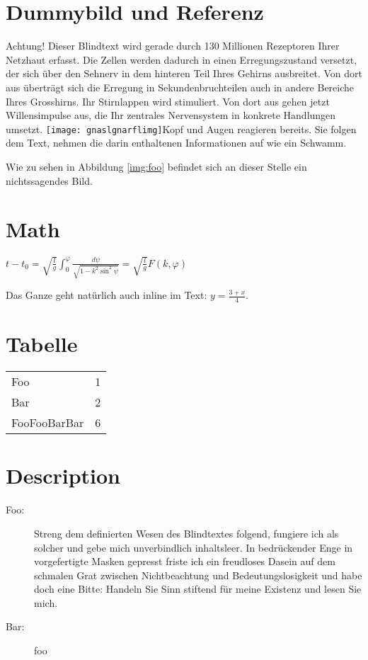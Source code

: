 \documentclass[a4paper,parskip=half,oneside]{scrbook}
\begin{document}
\section{Dummybild und Referenz}

Achtung! Dieser Blindtext wird gerade durch 130 Millionen Rezeptoren Ihrer Netzhaut erfasst. Die Zellen werden dadurch in einen 
Erregungszustand versetzt, der sich über den Sehnerv in dem hinteren Teil Ihres Gehirns ausbreitet.
Von dort aus überträgt sich die Erregung in Sekundenbruchteilen auch in andere Bereiche Ihres Grosshirns. 
Ihr Stirnlappen wird stimuliert. Von dort aus gehen jetzt Willensimpulse aus, die Ihr zentrales Nervensystem in konkrete 
Handlungen umsetzt. \texttt{[image: gnaslgnarflimg]}Kopf und Augen reagieren bereits. Sie folgen dem Text, nehmen die darin enthaltenen Informationen auf wie ein Schwamm.


Wie zu sehen in Abbildung \ref{img:foo} befindet sich an dieser Stelle ein nichtssagendes Bild.

\section{Math}
\begin{math}
	t-t_{0}=\sqrt{\frac{l}{g}}\int_{0}^{\varphi}{\frac{d\psi}{\sqrt{1-k^{2}\sin^{2} {\psi}}}} = \sqrt{\frac{l}{g}} F(k,\varphi)
\end{math}

Das Ganze geht natürlich auch inline im Text: $y=\frac{3 + x}{4}$.

\section{Tabelle}
\begin{tabular}{l r}
Foo  & 1 \\
Bar & 2 \\
FooFooBarBar  & 6 \\
\end{tabular}

\section{Description}
  \begin{description}
    \item [Foo:]  Streng dem definierten Wesen des Blindtextes folgend, fungiere ich als solcher und gebe mich unverbindlich inhaltsleer. In bedrückender Enge in vorgefertigte Masken gepresst friste ich ein freudloses Dasein auf dem schmalen Grat zwischen Nichtbeachtung und Bedeutungslosigkeit und habe doch eine Bitte: Handeln Sie Sinn stiftend für meine Existenz und lesen Sie mich.
    \item [Bar:] foo
  \end{description}
\end{document}
